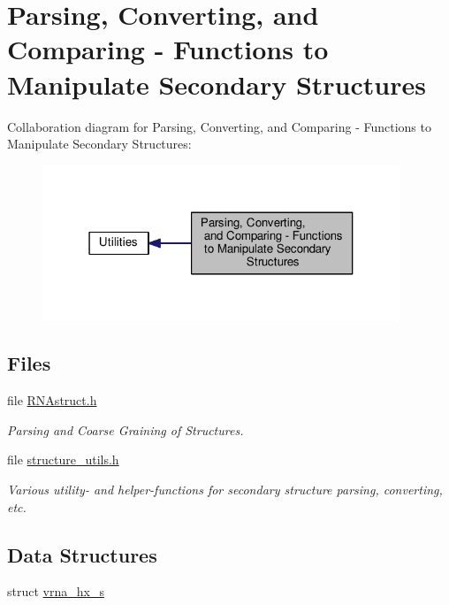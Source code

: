 \hypertarget{group__struct__utils}{\section{Parsing, Converting, and Comparing -\/ Functions to Manipulate Secondary Structures}
\label{group__struct__utils}
}
Collaboration diagram for Parsing, Converting, and Comparing -\/ Functions to Manipulate Secondary Structures\-:
\nopagebreak
\begin{figure}[H]
\begin{center}
\leavevmode
\includegraphics[width=304pt]{group__struct__utils}
\end{center}
\end{figure}
\subsection*{Files}
\begin{DoxyCompactItemize}
\item 
file \hyperlink{RNAstruct_8h}{R\-N\-Astruct.\-h}
\begin{DoxyCompactList}\small\item\em Parsing and Coarse Graining of Structures. \end{DoxyCompactList}\item 
file \hyperlink{structure__utils_8h}{structure\-\_\-utils.\-h}
\begin{DoxyCompactList}\small\item\em Various utility-\/ and helper-\/functions for secondary structure parsing, converting, etc. \end{DoxyCompactList}\end{DoxyCompactItemize}
\subsection*{Data Structures}
\begin{DoxyCompactItemize}
\item 
struct \hyperlink{group__struct__utils_structvrna__hx__s}{vrna\-\_\-hx\-\_\-s}
\end{DoxyCompactItemize}

